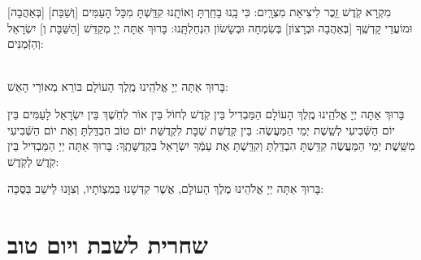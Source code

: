 \documentclass[twoside, openany, parskip=half, 11pt]{book}
\begin{document}
[בְּאַהֲבָה] מִקְרָא קֹֽדֶשׁ זֵֽכֶר לִיצִיאַת מִצְרָֽיִם: כִּי בָֽנוּ בָחַֽרְתָּ וְאוֹתָֽנוּ קִדַּֽשְׁתָּ מִכָּל הָעַמִּים [וְשַׁבַּת] וּמוֹעֲדֵי קָדְשֶֽׁךָ [בְּאַהֲבָה וּבְרָצוֹן] בְּשִׂמְחָה וּבְשָׂשׂוֹן הִנְחַלְתָּֽנוּ: בָּרוּךְ אַתָּה יְיָ מְקַדֵּשׁ [הַשַּׁבָּת וְ] יִשְׂרָאֵל וְהַזְּֿמַנִּים:

\begin{sometimes}

\\
בָּרוּךְ אַתָּה יְיָ אֱלֹהֵֽינוּ מֶֽלֶךְ הָעוֹלָם בּוֹרֵא מְאוֹרֵי הָאֵשׁ:

בָּרוּךְ אַתָּה יְיָ אֱלֹהֵֽינוּ מֶֽלֶךְ הָעוֹלָם הַמַּבְדִיל בֵּין קֹֽדֶשׁ לְחוֹל בֵּין אוֹר לְחֹֽשֶׁךְ בֵּין יִשְׂרָאֵל לָעַמִּים בֵּין יוֹם הַשְּֿׁבִיעִי לְשֵֽׁשֶׁת יְמֵי הַמַּעֲשֶׂה: בֵּין קְדֻשַּׁת שַׁבָּת לִקְדֻשַּׁת יוֹם טוֹב הִבְדַּֽלְתָּ וְאֶת יוֹם הַשְּֿׁבִיעִי מִשֵּֽׁשֶׁת יְמֵי הַמַּעֲשֶׂה קִדַּֽשְׁתָּ הִבְדַּֽלְתָּ וְקִדַּֽשְׁתָּ אֶת עַמְּֿךָ יִשְׂרָאֵל בִּקְדֻשָּׁתֶֽךָ: בָּרוּךְ אַתָּה יְיָ הַמַּבְדִּיל בֵּין קֹֽדֶשׁ לְקֹֽדֶשׁ:

\end{sometimes}

בָּרוּךְ אַתָּה יְיָ אֱלֹהֵינוּ מֶלֶךְ הָעוֹלָם, אֲשֶׁר קִדְּשָׁנוּ בְּמִצְוֹתָיו, וְצִוָּנוּ לֵישֵׁב בַּסֻּכָּה:






\chapter[שחרית לשבת ויום טוב]{ שחרית לשבת ויום טוב }
\end{document}
